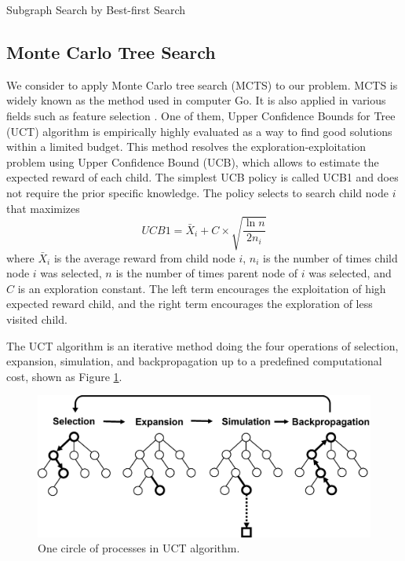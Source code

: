 \begin{algorithm2e}[H]
  \caption{Subgraph Search by Best-first Search}
  \label{alg:bfs}
\end{algorithm2e}

\subsection{Monte Carlo Tree Search}
We consider to apply Monte Carlo tree search (MCTS) 
\cite{Levente:2006, Romaric:2010, Cameron:2012} to our problem. 
MCTS is widely known as the method used in computer Go. 
It is also applied in various fields such as feature selection \cite{Romaric:2010}. 
One of them, Upper Confidence Bounds for Tree (UCT) algorithm 
\cite{Levente:2006} is empirically highly evaluated as a way to find good solutions within a limited budget.
This method resolves the exploration-exploitation problem using Upper Confidence Bound (UCB),
which allows to estimate the expected reward of each child.
The simplest UCB policy is called UCB1 and does not require the prior specific knowledge.
The policy selects to search child node $i$ that maximizes
\begin{equation}
  \label{eq:ucb}
  UCB1 = \bar{X}_{i} + C \times \sqrt{\frac{\ln{n}}{2 n_{i}}}
\end{equation}
where $\bar{X}_{i}$ is the average reward from child node $i$, 
$n_{i}$ is the number of times child node $i$ was selected, 
$n$ is the number of times parent node of $i$ was selected,
and $C$ is an exploration constant.
The left term encourages the exploitation of high expected reward child,
and the right term encourages the exploration of less visited child.

The UCT algorithm is an iterative method 
doing the four operations of selection, expansion, 
simulation, and backpropagation up to a predefined computational cost, shown as Figure \ref{fig:MCTS}.
\begin{figure}[t]
  \centering
  \includegraphics[width=0.9\linewidth]{img/MCTS.eps}
  \caption{One circle of processes in UCT algorithm.}
  \label{fig:MCTS}
\end{figure}


